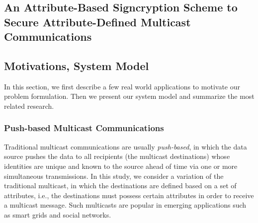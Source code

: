 \documentclass[letterpaper,12pt]{article}
\begin{document}
   \newpage
   \begin{singlespace}
   \section{An Attribute-Based Signcryption Scheme to Secure Attribute-Defined Multicast Communications}\label{sec:CP_ABSC_title}
   \end{singlespace}




\subsection {Motivations, System Model} \label{sec:motivation}

In this section, we first describe a few real world applications to motivate our problem formulation. Then we present our system model and summarize the most related research.

\subsubsection{Push-based Multicast Communications} \label{sec:push}

Traditional multicast communications are usually \emph{push-based}, in which the data source pushes the data to all recipients (the multicast destinations) whose identities are unique and known to the source ahead of time via one or more simultaneous transmissions. In this study, we consider a variation of the traditional multicast, in which the destinations are defined based on a set of attributes, i.e., the destinations must possess certain attributes in order to receive a multicast message. Such multicasts are popular in emerging applications such as smart grids and social networks. %
\end{document}
